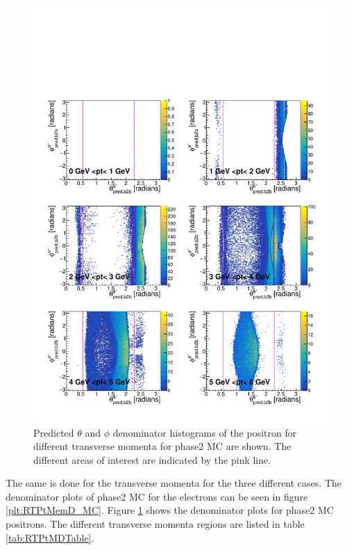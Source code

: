 \documentclass[a4paper,11pt,twosided,final,german,openbib,pdftex,listof=totoc,bibliography=totoc]{scrbook}
\begin{document}
\begin{figure}[h!]
	\includegraphics[width=\textwidth]{Plots/master/RTPtMepD_MC.pdf}
	\caption[Denominator $\theta$-$\phi$ Positron Transverse Momentum MC]{Predicted $\theta$ and $\phi$ denominator histograms of the positron for different transverse momenta for phase2 MC are shown. The different areas of interest are indicated by the pink line.
}
	\label{plt:RTPtMepD_MC}
\end{figure}

The same is done for the transverse momenta for the three different cases. The denominator plots of phase2 MC for the electrons can be seen in figure \ref{plt:RTPtMemD_MC}. Figure \ref{plt:RTPtMepD_MC} shows the denominator plots for phase2 MC positrons. The different transverse momenta regions are listed in table \ref{tab:RTPtMDTable}.
\end{document}
